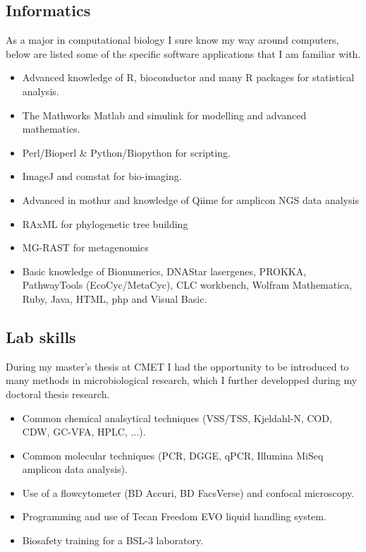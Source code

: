 \documentclass[a4paper,11pt,oneside]{article}
\begin{document}
\subsection*{Informatics}
As a major in computational biology I sure know my way around computers, below are listed some of the specific software applications that I am familiar with.
\begin{itemize}
	\item Advanced knowledge of R, bioconductor and many R packages for statistical analysis.
	\item The Mathworks Matlab and simulink for modelling and advanced mathematics.
	\item Perl/Bioperl \& Python/Biopython for scripting.
	\item ImageJ and comstat for bio-imaging.
  \item Advanced in mothur and knowledge of Qiime for amplicon NGS data analysis
  \item RAxML for phylogenetic tree building
  \item MG-RAST for metagenomics
	\item Basic knowledge of Bionumerics, DNAStar lasergenes, PROKKA, PathwayTools (EcoCyc/MetaCyc), CLC workbench, Wolfram Mathematica,  Ruby, Java, HTML, php and Visual Basic.
\end{itemize}
\subsection*{Lab skills}
During my master's thesis at CMET I had the opportunity to be introduced to many methods in microbiological research, which I further developped during my doctoral thesis research.
\begin{itemize}
	\item Common chemical analsytical techniques (VSS/TSS, Kjeldahl-N, COD, CDW, GC-VFA, HPLC, $\ldots$).
	\item Common molecular techniques (PCR, DGGE, qPCR, Illumina MiSeq amplicon data analysis).
	\item Use of a flowcytometer (BD Accuri, BD FacsVerse) and confocal microscopy.
  \item Programming and use of Tecan Freedom EVO liquid handling system.
	\item Biosafety training for a BSL-3 laboratory.
\end{itemize}
\end{document}
